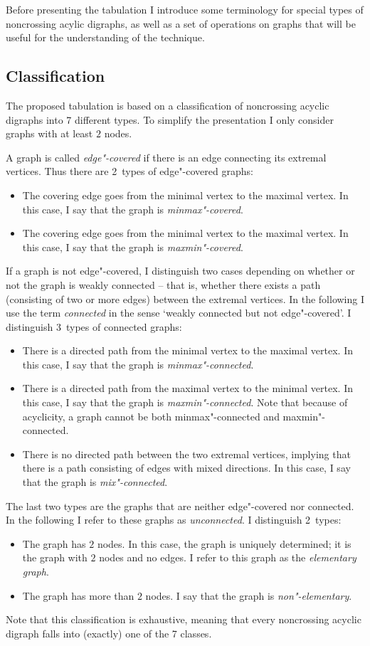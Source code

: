 \documentclass[a4paper]{article}
\begin{document}
Before presenting the tabulation I introduce some terminology for special types of noncrossing acylic digraphs, as well as a set of operations on graphs that will be useful for the understanding of the technique.

\subsection{Classification}
\label{sec:Classification}

The proposed tabulation is based on a classification of noncrossing acyclic digraphs into 7 different types.
To simplify the presentation I only consider graphs with at least $2$ nodes.

A graph is called \emph{edge"-covered} if there is an edge connecting its extremal vertices.
Thus there are 2~types of edge"-covered graphs:
\begin{itemize}
	\item The covering edge goes from the minimal vertex to the maximal vertex. In this case, I say that the graph is \emph{minmax"-covered}.
	\item The covering edge goes from the minimal vertex to the maximal vertex. In this case, I say that the graph is \emph{maxmin"-covered}.
\end{itemize}
If a graph is not edge"-covered, I distinguish two cases depending on whether or not the graph is weakly connected -- that is, whether there exists a path (consisting of two or more edges) between the extremal vertices.
In the following I use the term \emph{connected} in the sense `weakly connected but not edge"-covered'.
I distinguish 3~types of connected graphs:
\begin{itemize}
	\item There is a directed path from the minimal vertex to the maximal vertex. In this case, I say that the graph is \emph{minmax"-connected}.
	\item There is a directed path from the maximal vertex to the minimal vertex. In this case, I say that the graph is \emph{maxmin"-connected}. Note that because of acyclicity, a graph cannot be both minmax"-connected and maxmin"-connected.
	\item There is no directed path between the two extremal vertices, implying that there is a path consisting of edges with mixed directions. In this case, I say that the graph is \emph{mix"-connected}.
\end{itemize}
The last two types are the graphs that are neither edge"-covered nor connected.
In the following I refer to these graphs as \emph{unconnected}.
I distinguish 2~types:
\begin{itemize}
	\item The graph has $2$ nodes. In this case, the graph is uniquely determined; it is the graph with $2$ nodes and no edges. I refer to this graph as the \emph{elementary graph}.
	\item The graph has more than $2$ nodes. I say that the graph is \emph{non"-elementary}.
\end{itemize}
Note that this classification is exhaustive, meaning that every noncrossing acyclic digraph falls into (exactly) one of the 7 classes.
\end{document}
